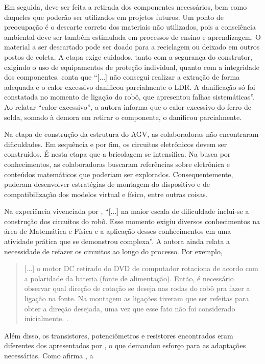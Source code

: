 \documentclass[portuguese]{textolivre}
\begin{document}
Em seguida, deve ser feita a retirada dos componentes necessários, bem como daqueles que poderão ser utilizados em projetos futuros. Um ponto de preocupação é o descarte correto dos materiais não utilizados, pois a consciência ambiental deve ser também estimulada em processos de ensino e aprendizagem. O material a ser descartado pode ser doado para a reciclagem ou deixado em outros postos de coleta. A etapa exige cuidados, tanto com a segurança do construtor, exigindo o uso de equipamentos de proteção individual, quanto com a integridade dos componentes. \textcite[p. 43-44]{AlvesMonica2022} conta que “[...] não consegui realizar a extração de forma adequada e o calor excessivo danificou parcialmente o LDR. A danificação só foi constatada no momento de ligação do robô, que apresentou falhas sistemáticas”. Ao relatar “calor excessivo”, a autora informa que o calor excessivo do ferro de solda, somado à demora em retirar o componente, o danificou parcialmente.

Na etapa de construção da estrutura do AGV, as colaboradoras não encontraram dificuldades. Em sequência e por fim, os circuitos eletrônicos devem ser construídos. É nesta etapa que a bricolagem se intensifica. Na busca por conhecimentos, as colaboradoras buscaram referências sobre eletrônica e conteúdos matemáticos que poderiam ser explorados. Consequentemente, puderam desenvolver estratégias de montagem do dispositivo e de compatibilização dos modelos virtual e físico, entre outras coisas.

Na experiência vivenciada por \textcite[p. 47]{AlvesMonica2022}, “[...] na maior escala de dificuldade inclui-se a construção dos circuitos do robô. Esse momento exigiu diversos conhecimentos na área de Matemática e Física e a aplicação desses conhecimentos em uma atividade prática que se demonstrou complexa”. A autora ainda relata a necessidade de refazer os circuitos ao longo do processo. Por exemplo,

\begin{quote}
[...] o motor DC retirado do DVD de computador rotaciona de acordo com a polaridade da bateria (fonte de alimentação). Então, é necessário observar qual direção de rotação se deseja nas rodas do robô pra fazer a ligação na fonte. Na montagem as ligações tiveram que ser refeitas para obter a direção desejada, uma vez que esse fato não foi considerado inicialmente. \cite[p. 47]{AlvesMonica2022}.
\end{quote}

Além disso, os transistores, potenciômetros e resistores encontrados eram diferentes dos apresentados por \textcite{Guimaraes2020}, o que demandou esforço para as adaptações necessárias. Como afirma \textcite[p. 33]{Nunes2014}, a
\end{document}
